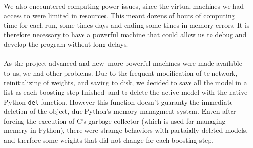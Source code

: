 \documentclass[11 pt]{article}
\begin{document}
\paragraph{} We also encountered computing power issues, since the virtual machines we had access to were limited in resources. This meant dozens of hours of computing time for each run, some times days and ending some times in memory errors. It is therefore necessary to have a powerful machine that could allow us to debug and develop the program without long delays. 

\paragraph{}As the project advanced and new, more powerful machines were made available to us, we had other problems. Due to the frequent modification of te network, reinitializing of weights, and saving to disk, we decided to save all the model in a list as each boosting step finished, and to delete the active model with the native Python \texttt{del} function. However this function doesn't guaranty the immediate deletion of the object, due Python's memory managment system. Enven after forcing the execution of C's garbage collector (which is used for managing memory in Python), there were strange behaviors with partaially deleted models, and therfore some weights that did not change for each boosting step.

\end{document}

